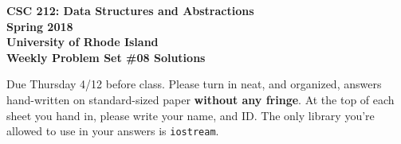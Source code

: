 \documentclass[11pt]{article}
\begin{document}
    \thispagestyle{empty}
    
    \begin{center}
        {\Large\bf CSC 212: Data Structures and Abstractions}\\
        \medskip
        {\Large\bf Spring 2018}\\
        \medskip
        {\Large\bf University of Rhode Island}\\
        \bigskip
        {\Large\bf Weekly Problem Set \#08 Solutions}
    \end{center}
    
    Due Thursday 4/12 before class. Please turn in neat, and organized, answers hand-written on standard-sized paper \textbf{without any fringe}. At the top of each sheet you hand in, please write your name, and ID.
    The only library you're allowed to use in your answers is \verb|iostream|.
    
\end{document}
